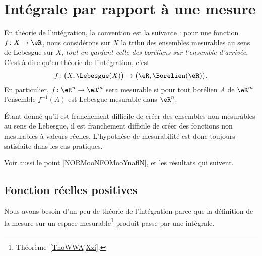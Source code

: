 
\section{Intégrale par rapport à une mesure}

\begin{normaltext}      \label{NORMooFZEDooIxSgLe}
    En théorie de l'intégration, la convention est la suivante : pour une fonction \( f\colon X\to \eR\), nous considérons sur \( X\) la tribu des ensembles mesurables au sens de Lebesgue sur \( X\), \emph{tout en gardant celle des boréliens sur l'ensemble d'arrivée}. C'est à dire qu'en théorie de l'intégration, c'est
    \begin{equation}
        f\colon \big( X,\Lebesgue(X) \big)\to \big( \eR,\Borelien(\eR) \big).
    \end{equation}
    En particulier, \( f\colon \eR^n\to \eR^m\) sera mesurable si pour tout borélien \( A\) de \( \eR^m\) l'ensemble \( f^{-1}(A)\) est Lebesgue-mesurable dans \( \eR^n\).

    Étant donné qu'il est franchement difficile de créer des ensembles non mesurables au sens de Lebesgue, il est franchement difficile de créer des fonctions non mesurables à valeurs réelles. L'hypothèse de mesurabilité est donc toujours satisfaite dans les cas pratiques.

    Voir aussi le point \ref{NORMooNFOMooYnaflN}, et les résultats qui suivent.
\end{normaltext}

\subsection{Fonction réelles positives}

Nous avons besoin d'un peu de théorie de l'intégration parce que la définition de la mesure sur un espace mesurable\footnote{Théorème~\ref{ThoWWAjXzi}.} produit passe par une intégrale.

